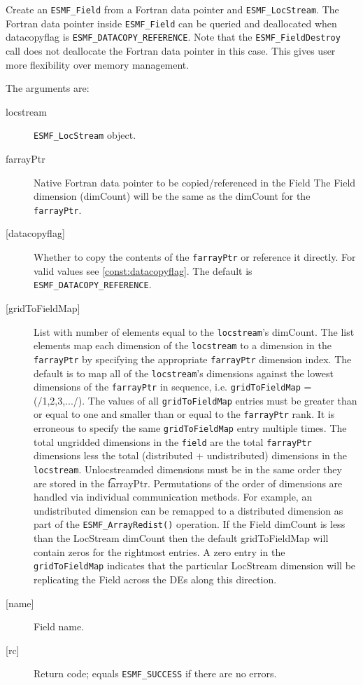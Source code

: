  
   \begin{sloppypar} 
   Create an {\tt ESMF\_Field} from a Fortran data pointer and {\tt ESMF\_LocStream}. 
   The Fortran data pointer inside {\tt ESMF\_Field} can be queried and deallocated when 
   datacopyflag is {\tt ESMF\_DATACOPY\_REFERENCE}. Note that the {\tt ESMF\_FieldDestroy} call does not 
   deallocate the Fortran data pointer in this case. This gives user more flexibility over memory management. 
   \end{sloppypar} 
   
   The arguments are: 
   \begin{description} 
   \item [locstream] 
   {\tt ESMF\_LocStream} object. 
   \item [farrayPtr] 
   Native Fortran data pointer to be copied/referenced in the Field 
   The Field dimension (dimCount) will be the same as the dimCount 
   for the {\tt farrayPtr}. 
   \item [{[datacopyflag]}] 
   Whether to copy the contents of the {\tt farrayPtr} or reference it directly. 
   For valid values see \ref{const:datacopyflag}. The default is 
   {\tt ESMF\_DATACOPY\_REFERENCE}. 
   \item [{[gridToFieldMap]}] 
   List with number of elements equal to the 
   {\tt locstream}'s dimCount. The list elements map each dimension 
   of the {\tt locstream} to a dimension in the {\tt farrayPtr} by 
   specifying the appropriate {\tt farrayPtr} dimension index. The default is to 
   map all of the {\tt locstream}'s dimensions against the lowest dimensions of 
   the {\tt farrayPtr} in sequence, i.e. {\tt gridToFieldMap} = (/1,2,3,.../). 
   The values of all {\tt gridToFieldMap} entries must be greater than or equal 
   to one and smaller than or equal to the {\tt farrayPtr} rank. 
   It is erroneous to specify the same {\tt gridToFieldMap} entry 
   multiple times. The total ungridded dimensions in the {\tt field} 
   are the total {\tt farrayPtr} dimensions less 
   the total (distributed + undistributed) dimensions in 
   the {\tt locstream}. Unlocstreamded dimensions must be in the same order they are 
   stored in the {\t farrayPtr}. Permutations of the order of 
   dimensions are handled via individual communication methods. For example, 
   an undistributed dimension can be remapped to a distributed dimension 
   as part of the {\tt ESMF\_ArrayRedist()} operation. 
   If the Field dimCount is less than the LocStream dimCount then the default 
   gridToFieldMap will contain zeros for the rightmost entries. A zero 
   entry in the {\tt gridToFieldMap} indicates that the particular 
   LocStream dimension will be replicating the Field across the DEs along 
   this direction. 
   \item [{[name]}] 
   Field name. 
   \item [{[rc]}] 
   Return code; equals {\tt ESMF\_SUCCESS} if there are no errors. 
   \end{description} 
    
